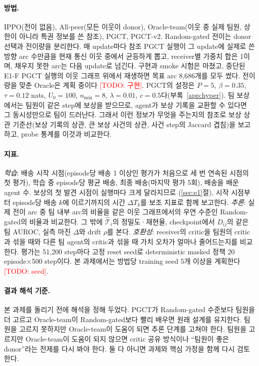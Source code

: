 \documentclass[twocolumn,10pt]{article}
\theoremstyle{remark}
\newcommand{\todo}[1]{\textcolor{red}{[TODO: #1]}}
\newcommand{\ours}{PGCT}
\begin{document}
\paragraph{방법.} IPPO(전이 없음), All-peer(모든 이웃이 donor), Oracle-team(이웃 중 실제 팀원, 상한이 아니라 특권 정보를 쓴 참조),
\ours{}, \ours{}-v2. Random-gated 전이는 donor 선택과 전이량을 분리한다. 매 update마다 참조 \ours{} 실행이 그 update에 실제로 쓴
방향 arc 수만큼을 현재 통신 이웃 중에서 균등하게 뽑고, receiver별 가중치 합은 1이며, 채우지 못한 arc는 다음 update로 넘긴다.
구현과 smoke 시험은 마쳤고, 중단된 E1-F \ours{} 실행의 이웃 그래프 위에서 재생하면 목표 arc 8{,}686개를 모두 썼다. 전이량을 맞춘
Oracle은 계획 중이다 \todo{구현}. \ours{}의 설정은 $P=5$, $\beta=0.35$, $\tau=0.12$ nats, $U_0=100$, $n_{\min}=8$,
$\lambda=0.01$, $c=0.5$다(부록~\ref{app:hyper}). 팀 보상에서는 팀원이 같은 step에 보상을 받으므로, agent가 보상 기록을 교환할 수
있다면 그 동시성만으로 팀이 드러난다. 그래서 이런 정보가 무엇을 주는지의 참조로 보상 상관 기준선(보상 기록의 상관, 큰 보상
사건의 상관, 사건 step의 Jaccard 겹침)을 보고하고, probe 통계를 이것과 비교한다.

\paragraph{지표.} \emph{학습}: 배송 시작 시점(episode당 배송 1 이상인 평가가 처음으로 세 번 연속된 시점의 첫 평가), 학습 중
episode당 평균 배송, 최종 배송(마지막 평가 5회), 배송을 배운 agent 수. 보상의 첫 발견 시점이 실행마다 크게 달라지므로
(\ref{sec:e1}절), 시작 시점부터 episode당 배송 $k$에 이르기까지의 시간 $\Delta T_k$를 보조 지표로 함께 보고한다. \emph{추론}:
실제 전이 arc 중 팀 내부 arc의 비율을 같은 이웃 그래프에서의 우연 수준인 Random-gated의 비율과 비교한다. 그 밖에
$\hat{\mathcal{T}}_i$의 정밀도·재현율, checkpoint에서 $D_{ij}$의 같은 팀 AUROC, 실측 마진 $\Delta$와 drift $\rho$를 본다.
\emph{호환성}: receiver의 critic을 팀원의 critic과 섞을 때와 다른 팀 agent의 critic과 섞을 때 가치 오차가 얼마나 줄어드는지를
비교한다. 평가는 51{,}200 step마다 고정 reset seed로 deterministic masked 정책 20 episode×500 step이다. 본 과제에서는 방법당
training seed 5개 이상을 계획한다 \todo{seed}.

\paragraph{결과 해석 기준.} 본 과제를 돌리기 전에 해석을 정해 두었다. \ours{}가 Random-gated 수준보다 팀원을 더 고르고
Oracle-team이 Random-gated보다 빨리 배우면 원래 설계를 유지한다. 팀원을 고르지 못하지만 Oracle-team이 도움이 되면 추론 단계를
고쳐야 한다. 팀원을 고르지만 Oracle-team이 도움이 되지 않으면 critic 공유 방식이나 ``팀원이 좋은 donor''라는 전제를 다시 봐야
한다. 둘 다 아니면 과제와 핵심 가정을 함께 다시 검토한다.
\end{document}
